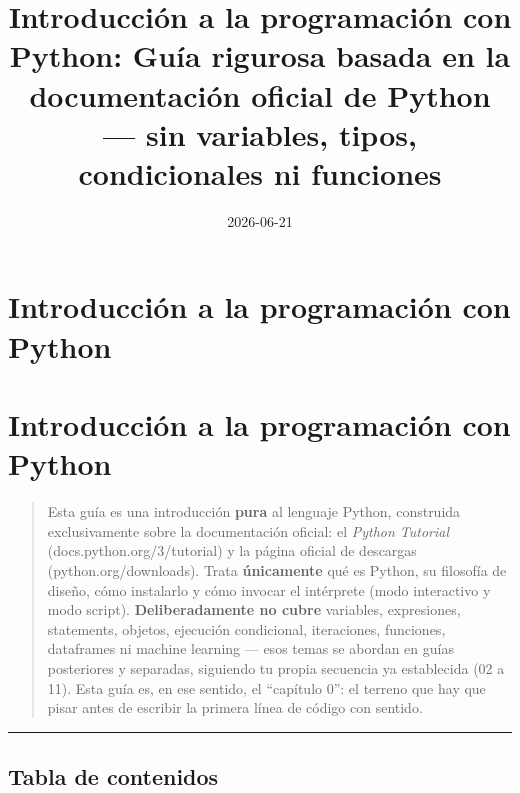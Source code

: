 \documentclass[
  doc,
  floatsintext,
  longtable,
  a4paper,
  nolmodern,
  notxfonts,
  notimes,
  12pt,
  colorlinks=true,linkcolor=blue,citecolor=blue,urlcolor=blue]{apa7}
\title{Introducción a la programación con Python: Guía rigurosa basada
en la documentación oficial de Python --- sin variables, tipos,
condicionales ni funciones}
\affiliation{
{Escuela Profesional de Economía, Universidad Nacional de San Cristóbal
de Huamanga}}
\date{2026-06-21}
\begin{document}
\maketitle


\hypertarget{toc}{}
\tableofcontents
\newpage
\section[Introduction]{Introducción a la programación con Python}

\setcounter{secnumdepth}{3}

\setlength\LTleft{0pt}




\section{Introducción a la programación con
Python}\label{introducciuxf3n-a-la-programaciuxf3n-con-python}

\begin{quote}
Esta guía es una introducción \textbf{pura} al lenguaje Python,
construida exclusivamente sobre la documentación oficial: el
\emph{Python Tutorial} (docs.python.org/3/tutorial) y la página oficial
de descargas (python.org/downloads). Trata \textbf{únicamente} qué es
Python, su filosofía de diseño, cómo instalarlo y cómo invocar el
intérprete (modo interactivo y modo script). \textbf{Deliberadamente no
cubre} variables, expresiones, statements, objetos, ejecución
condicional, iteraciones, funciones, dataframes ni machine learning ---
esos temas se abordan en guías posteriores y separadas, siguiendo tu
propia secuencia ya establecida (02 a 11). Esta guía es, en ese sentido,
el ``capítulo 0'': el terreno que hay que pisar antes de escribir la
primera línea de código con sentido.
\end{quote}

\begin{center}\rule{0.5\linewidth}{0.5pt}\end{center}

\subsection{Tabla de contenidos}\label{tabla-de-contenidos}
\end{document}
